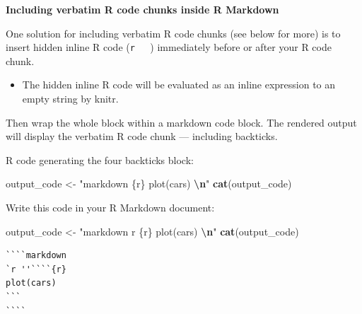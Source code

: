 \documentclass[
  a4paper,
  twoside,
  openright]{book}
\newenvironment{Shaded}{\begin{snugshade}}{\end{snugshade}}
\newcommand{\FunctionTok}[1]{\textcolor[rgb]{0.13,0.29,0.53}{\textbf{#1}}}
\newcommand{\NormalTok}[1]{#1}
\newcommand{\OtherTok}[1]{\textcolor[rgb]{0.56,0.35,0.01}{#1}}
\newcommand{\SpecialCharTok}[1]{\textcolor[rgb]{0.81,0.36,0.00}{\textbf{#1}}}
\newcommand{\StringTok}[1]{\textcolor[rgb]{0.31,0.60,0.02}{#1}}
\providecommand{\tightlist}{%
  \setlength{\itemsep}{0pt}\setlength{\parskip}{0pt}}
\theoremstyle{definition}
\theoremstyle{definition}
\theoremstyle{definition}
\theoremstyle{definition}
\theoremstyle{remark}
\begin{document}
\textbf{Including verbatim R code chunks inside R Markdown}

One solution for including verbatim R code chunks (see below for more) is to insert hidden inline R code (\texttt{\textasciigrave{}r\ \ \ \textquotesingle{}\textquotesingle{}\textasciigrave{}}) immediately before or after your R code chunk.

\begin{itemize}
\tightlist
\item
  The hidden inline R code will be evaluated as an inline expression to an empty string by knitr.
\end{itemize}

Then wrap the whole block within a markdown code block. The rendered output will display the verbatim R code chunk --- including backticks.

R code generating the four backticks block:

\begin{Shaded}
\begin{Highlighting}[]
\NormalTok{output\_code }\OtherTok{\textless{}{-}}
\StringTok{"\textasciigrave{}\textasciigrave{}\textasciigrave{}\textasciigrave{}markdown}
\StringTok{\textasciigrave{}\textasciigrave{}\textasciigrave{}\{r\}}
\StringTok{plot(cars)}
\StringTok{\textasciigrave{}\textasciigrave{}\textasciigrave{} }\SpecialCharTok{\textbackslash{}n}\StringTok{\textasciigrave{}\textasciigrave{}\textasciigrave{}\textasciigrave{}"}
\FunctionTok{cat}\NormalTok{(output\_code)}
\end{Highlighting}
\end{Shaded}

Write this code in your R Markdown document:

\begin{Shaded}
\begin{Highlighting}[]
\NormalTok{output\_code }\OtherTok{\textless{}{-}}
\StringTok{"\textasciigrave{}\textasciigrave{}\textasciigrave{}\textasciigrave{}markdown}
\StringTok{\textasciigrave{}r \textquotesingle{}\textquotesingle{}\textasciigrave{}\textasciigrave{}\textasciigrave{}\textasciigrave{}\{r\}}
\StringTok{plot(cars)}
\StringTok{\textasciigrave{}\textasciigrave{}\textasciigrave{} }\SpecialCharTok{\textbackslash{}n}\StringTok{\textasciigrave{}\textasciigrave{}\textasciigrave{}\textasciigrave{}"}
\FunctionTok{cat}\NormalTok{(output\_code)}
\end{Highlighting}
\end{Shaded}

\begin{verbatim}
````markdown
`r ''````{r}
plot(cars)
``` 
````
\end{verbatim}
\end{document}
